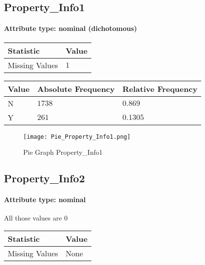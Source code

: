 \subsection{Property\_Info1}
\paragraph{Attribute type: nominal (dichotomous)}
\begin{table}[H]
	\renewcommand{\arraystretch}{1.25}
	\begin{tabular}{l|l}
		\textbf{Statistic} & \textbf{Value}\\\hline
		Missing Values& $1$\\\hline
	\end{tabular}
\end{table}
\begin{table}[H]
	\renewcommand{\arraystretch}{1.25}
	\begin{tabular}{l|l|l}
		\textbf{Value} & \textbf{Absolute Frequency} & \textbf{Relative Frequency}\\\hline
		N&$1738$&$0.869$\\\hline
		Y&$261$&$0.1305$
\end{tabular}
\end{table}

\begin{figure}[H]
	\begin{center}
		\texttt{[image: Pie\_Property\_Info1.png]}
	\end{center}
	\caption{Pie Graph Property\_Info1}
\end{figure}

\subsection{Property\_Info2}
\paragraph{Attribute type: nominal} All those values are $0$

\begin{table}[H]
	\renewcommand{\arraystretch}{1.25}
	\begin{tabular}{l|l}
		\textbf{Statistic} & \textbf{Value}\\\hline
		Missing Values& None\\\hline
	\end{tabular}
\end{table}


